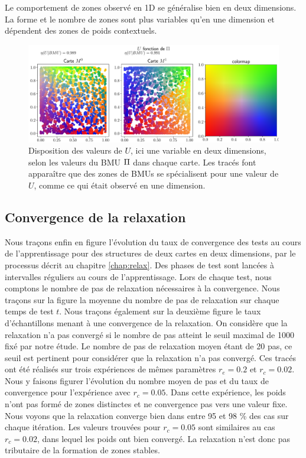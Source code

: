 \documentclass[../main]{subfiles}
\begin{document}
Le comportement de zones observé en 1D se généralise bien en deux dimensions. La forme et le nombre de zones sont plus variables qu'en une dimension et dépendent des zones de poids contextuels.

\begin{figure}
	\includegraphics[width=\textwidth]{U_Pi_rc002_afterbug.pdf}
	\caption{Disposition des valeurs de $U$, ici une variable en deux dimensions, selon les valeurs du BMU $\Pi$ dans chaque carte. Les tracés font apparaître que des zones de BMUs se spécialisent pour une valeur de $U$, comme ce qui était observé en une dimension. \label{fig:U_BMU}}
\end{figure}


\subsection{Convergence de la relaxation}

Nous traçons enfin en figure \label{fig:relax} l'évolution du taux de convergence des tests au cours de l'apprentissage pour des structures de deux cartes en deux dimensions, par le
processus décrit au chapitre \ref{chap:relax}.
Des phases de test sont lancées à intervalles réguliers au cours de l'apprentissage. Lors de chaque test, nous comptons le nombre de pas de relaxation nécessaires à la convergence. Nous traçons sur la figure la moyenne du nombre de pas de relaxation sur chaque temps de test $t$. 
Nous traçons également sur la deuxième figure le taux d'échantillons menant à une convergence de la relaxation. On considère que la relaxation n'a pas convergé si le nombre de pas atteint le seuil maximal de 1000 fixé par notre étude. Le nombre de pas de relaxation moyen étant de 20 pas, ce seuil est pertinent pour considérer que la relaxation n'a pas convergé. 
Ces tracés ont été réalisés sur trois expériences de mêmes paramètres $r_e=0.2$ et $r_c = 0.02$.
Nous y faisons figurer l'évolution du nombre moyen de pas et du taux de convergence pour l'expérience avec $r_c = 0.05$. Dans cette expérience, les poids n'ont pas formé de zones distinctes et ne convergence pas vers une valeur fixe.
Nous voyons que la relaxation converge bien dans entre 95 et 98 \% des cas sur chaque itération.
Les valeurs trouvées pour $r_c = 0.05$ sont similaires au cas $r_c = 0.02$, dans lequel les poids ont bien convergé. La relaxation n'est donc pas tributaire de la formation de zones stables.
\end{document}
